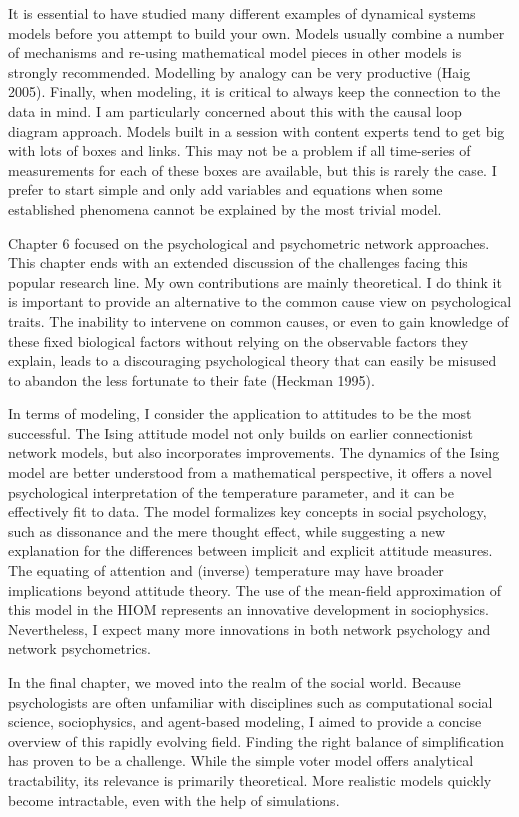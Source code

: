 \documentclass[
  letterpaper,
]{scrbook}
\begin{document}
It is essential to have studied many different examples of dynamical
systems models before you attempt to build your own. Models usually
combine a number of mechanisms and re-using mathematical model pieces in
other models is strongly recommended. Modelling by analogy can be very
productive (Haig 2005). Finally, when modeling, it is critical to always
keep the connection to the data in mind. I am particularly concerned
about this with the causal loop diagram approach. Models built in a
session with content experts tend to get big with lots of boxes and
links. This may not be a problem if all time-series of measurements for
each of these boxes are available, but this is rarely the case. I prefer
to start simple and only add variables and equations when some
established phenomena cannot be explained by the most trivial model.

Chapter 6 focused on the psychological and psychometric network
approaches. This chapter ends with an extended discussion of the
challenges facing this popular research line. My own contributions are
mainly theoretical. I do think it is important to provide an alternative
to the common cause view on psychological traits. The inability to
intervene on common causes, or even to gain knowledge of these fixed
biological factors without relying on the observable factors they
explain, leads to a discouraging psychological theory that can easily be
misused to abandon the less fortunate to their fate (Heckman 1995).

In terms of modeling, I consider the application to attitudes to be the
most successful. The Ising attitude model not only builds on earlier
connectionist network models, but also incorporates improvements. The
dynamics of the Ising model are better understood from a mathematical
perspective, it offers a novel psychological interpretation of the
temperature parameter, and it can be effectively fit to data. The model
formalizes key concepts in social psychology, such as dissonance and the
mere thought effect, while suggesting a new explanation for the
differences between implicit and explicit attitude measures. The
equating of attention and (inverse) temperature may have broader
implications beyond attitude theory. The use of the mean-field
approximation of this model in the HIOM represents an innovative
development in sociophysics. Nevertheless, I expect many more
innovations in both network psychology and network psychometrics.

In the final chapter, we moved into the realm of the social world.
Because psychologists are often unfamiliar with disciplines such as
computational social science, sociophysics, and agent-based modeling, I
aimed to provide a concise overview of this rapidly evolving field.
Finding the right balance of simplification has proven to be a
challenge. While the simple voter model offers analytical tractability,
its relevance is primarily theoretical. More realistic models quickly
become intractable, even with the help of simulations.
\end{document}
